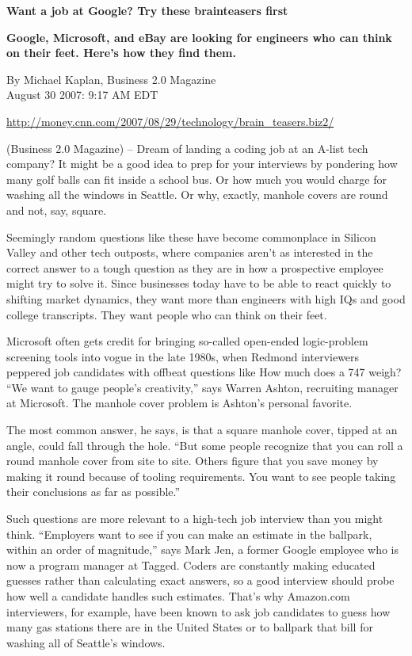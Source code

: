 \documentclass[10pt]{article}
\begin{document}
\begin{center}
{\Large \textbf{Want a job at Google?  Try these brainteasers first}}
\end{center}
\textbf{Google, Microsoft, and eBay are looking for engineers who can think on their feet. Here's how they find them.}

By Michael Kaplan, Business 2.0 Magazine\\
August 30 2007: 9:17 AM EDT

\url{http://money.cnn.com/2007/08/29/technology/brain_teasers.biz2/}

(Business 2.0 Magazine) -- Dream of landing a coding job at an A-list tech company?  It might be a good idea to prep for your interviews by pondering how many golf balls can fit inside a school bus.  Or how much you would charge for washing all the windows in Seattle.  Or why, exactly, manhole covers are round and not, say, square.

Seemingly random questions like these have become commonplace in Silicon Valley and other tech outposts, where companies aren't as interested in the correct answer to a tough question as they are in how a prospective employee might try to solve it. Since businesses today have to be able to react quickly to shifting market dynamics, they want more than engineers with high IQs and good college transcripts. They want people who can think on their feet.

Microsoft often gets credit for bringing so-called open-ended logic-problem screening tools into vogue in the late 1980s, when Redmond interviewers peppered job candidates with offbeat questions like How much does a 747 weigh? ``We want to gauge people's creativity,'' says Warren Ashton, recruiting manager at Microsoft. The manhole cover problem is Ashton's personal favorite.

The most common answer, he says, is that a square manhole cover, tipped at an angle, could fall through the hole. ``But some people recognize that you can roll a round manhole cover from site to site. Others figure that you save money by making it round because of tooling requirements. You want to see people taking their conclusions as far as possible.''

Such questions are more relevant to a high-tech job interview than you might think. ``Employers want to see if you can make an estimate in the ballpark, within an order of magnitude,'' says Mark Jen, a former Google employee who is now a program manager at Tagged. Coders are constantly making educated guesses rather than calculating exact answers, so a good interview should probe how well a candidate handles such estimates. That's why Amazon.com interviewers, for example, have been known to ask job candidates to guess how many gas stations there are in the United States or to ballpark that bill for washing all of Seattle's windows.
\end{document}
